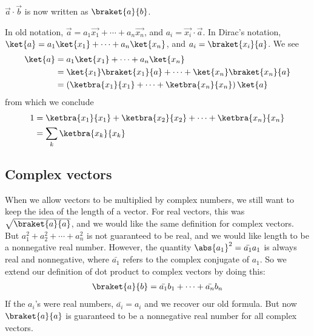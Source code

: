 \documentclass[12pt, oneside, letterpaper, fleqn]{article}
\begin{document}
$\vec{a} \cdot \vec{b}$ is now written as $\braket{a}{b}$.

In old notation, $\vec{a} = a_1\vec{x_1} +\dotsb+ a_n\vec{x_n}$, and
$a_i = \vec{x_i} \cdot \vec{a}$. In Dirac's notation, $\ket{a} =
a_1\ket{x_1} +\dotsb+ a_n\ket{x_n}$, and $a_i = \braket{x_i}{a}$. We see
\begin{align*}
\ket{a} &= a_1\ket{x_1} +\dotsb+ a_n\ket{x_n}\\
&= \ket{x_1}\braket{x_1}{a} +\dotsb+ \ket{x_n}\braket{x_n}{a}\\
&= \left(\ketbra{x_1}{x_1} +\dotsb+ \ketbra{x_n}{x_n}\right)\ket{a}
\end{align*}
from which we conclude
\begin{align}\begin{split}\label{eq:finite_id}
1 &= \ketbra{x_1}{x_1} + \ketbra{x_2}{x_2} +\dotsb+ \ketbra{x_n}{x_n}\\
&= \sum_k \ketbra{x_k}{x_k}
\end{split}\end{align}

\subsection{Complex vectors}
When we allow vectors to be multiplied by complex numbers, we still want
to keep the idea of the length of a vector. For real vectors, this was
$\sqrt{\braket{a}{a}}$, and we would like the same definition for
complex vectors. But $a_1^2 + a_2^2 + \dotsb + a_n^2$ is not guaranteed
to be real, and we would like length to be a nonnegative real number.
However, the quantity $\abs{a_1}^2 = \bar{a_1}a_1$ is always real and
nonnegative, where $\bar{a_1}$ refers to the complex conjugate of $a_1$. So
we extend our definition of dot product to complex vectors by doing
this:
\begin{align}
\braket{a}{b} = \bar{a_1}b_1 + \dotsb + \bar{a_n}b_n
\end{align}
If the $a_i$'s were real numbers, $\bar{a_i} = a_i$ and we recover our
old formula. But now $\braket{a}{a}$ is guaranteed to be a nonnegative
real number for all complex vectors.
\end{document}
